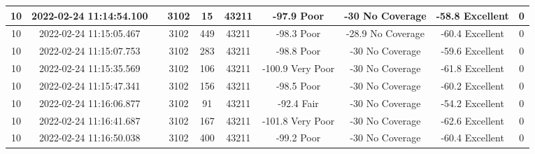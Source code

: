 \begin{longtable*}{|c|c|c|c|c|c|c|c|c|c|}
10&2022-02-24 11:14:54.100&&3102&15&43211& -97.9     Poor        & -30       No Coverage & -58.8     Excellent   & 0\\\hline
{}10&2022-02-24 11:15:05.467&&3102&449&43211& -98.3     Poor        & -28.9     No Coverage & -60.4     Excellent   & 0\\\hline
{}10&2022-02-24 11:15:07.753&&3102&283&43211& -98.8     Poor        & -30       No Coverage & -59.6     Excellent   & 0\\\hline
{}10&2022-02-24 11:15:35.569&&3102&106&43211& -100.9    Very Poor   & -30       No Coverage & -61.8     Excellent   & 0\\\hline
{}10&2022-02-24 11:15:47.341&&3102&156&43211& -98.5     Poor        & -30       No Coverage & -60.2     Excellent   & 0\\\hline
{}10&2022-02-24 11:16:06.877&&3102&91&43211& -92.4     Fair        & -30       No Coverage & -54.2     Excellent   & 0\\\hline
{}10&2022-02-24 11:16:41.687&&3102&167&43211& -101.8    Very Poor   & -30       No Coverage & -62.6     Excellent   & 0\\\hline
{}10&2022-02-24 11:16:50.038&&3102&400&43211& -99.2     Poor        & -30       No Coverage & -60.4     Excellent   & 0\\\hline

\end{longtable*}
